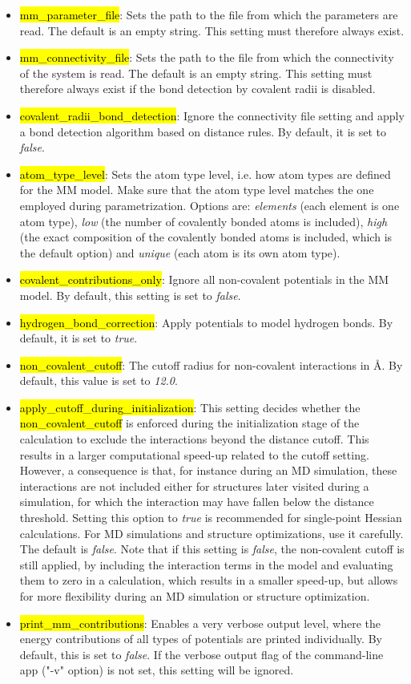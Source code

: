 \documentclass[]{tufte-book}
\begin{document}
{{\begin{itemize}
\item \hl{mm\_parameter\_file}: Sets the path to the file from which the parameters are read. The default is an empty string. This setting must therefore always exist.
\item \hl{mm\_connectivity\_file}: Sets the path to the file from which the connectivity of the system is read. The default is an empty string. This setting must therefore always exist if the bond detection by covalent radii is disabled.
\item \hl{covalent\_radii\_bond\_detection}: Ignore the connectivity file setting and apply a bond detection algorithm based on distance rules. By default, it is set to \textit{false}.
\item \hl{atom\_type\_level}: Sets the atom type level, i.e. how atom types are defined for the MM model. Make sure that the atom type level matches the one employed during parametrization. Options are: \textit{elements} (each element is one atom type), \textit{low} (the number of covalently bonded atoms is included), \textit{high} (the exact composition of the covalently bonded atoms is included, which is the default option) and \textit{unique} (each atom is its own atom type).
\item \hl{covalent\_contributions\_only}: Ignore all non-covalent potentials in the MM model. By default, this setting is set to \textit{false}.
\item \hl{hydrogen\_bond\_correction}: Apply potentials to model hydrogen bonds. By default, it is set to \textit{true}.
\item \hl{non\_covalent\_cutoff}: The cutoff radius for non-covalent interactions in \AA. By default, this value is set to \textit{12.0}.
\item \hl{apply\_cutoff\_during\_initialization}: This setting decides whether the \hl{non\_covalent\_cutoff} is enforced during the initialization stage of the calculation to exclude the interactions beyond the distance cutoff. This results in a larger computational speed-up related to the cutoff setting. However, a consequence is that, for instance during an MD simulation, these interactions are not included either for structures later visited during a simulation, for which the interaction may have fallen below the distance threshold. Setting this option to \textit{true} is recommended for single-point Hessian calculations. For MD simulations and structure optimizations, use it carefully. The default is \textit{false}. Note that if this setting is \textit{false}, the non-covalent cutoff is still applied, by including the interaction terms in the model and evaluating them to zero in a calculation, which results in a smaller speed-up, but allows for more flexibility during an MD simulation or structure optimization.
\item \hl{print\_mm\_contributions}: Enables a very verbose output level, where the energy contributions of all types of potentials are printed individually. By default, this is set to \textit{false}. If the verbose output flag of the command-line app ("-v" option) is not set, this setting will be ignored.
\end{itemize}

}}
\end{document}
